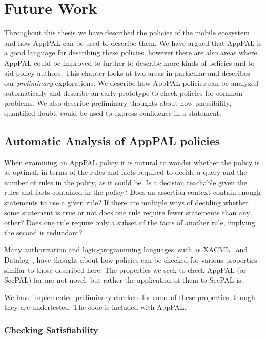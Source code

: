 \documentclass[thesis.tex]{subfiles}
\begin{document}
\chapter{Future Work}

Throughout this thesis we have described the policies of the mobile
ecosystem and how AppPAL can be used to describe them.  We have argued
that AppPAL is a good language for describing these policies, however
there are also areas where AppPAL could be improved to further to
describe more kinds of policies and to aid policy authors.  This
chapter looks at two areas in particular and describes our
\emph{preliminary} explorations.  We describe how AppPAL policies can
be analyzed automatically and describe an early prototype to check
policies for common problems.  We also describe preliminary thoughts
about how plausibility, quantified doubt, could be used to express
confidence in a statement.

\section{Automatic Analysis of AppPAL policies}
\label{sec:lint}

When examining an AppPAL policy it is natural to wonder whether the
policy is as optimal, in terms of the rules and facts required to
decide a query and the number of rules in the policy, as it could
be. Is a decision reachable given the rules and facts contained in the
policy?  Does an assertion context contain enough statements to use a
given rule? If there are multiple ways of deciding whether some
statement is true or not does one rule require fewer statements than
any other? Does one rule require only a subset of the facts of another
rule, implying the second is redundant?

Many authorization and logic-programming languages, such as
XACML~\cite{ramli_detecting_2015} and
Datalog~\cite{alon_levy_equivalence_1993,alon_levy_constraints_1992}, have
thought about how policies can be checked for various properties
similar to those described here.  The properties we seek to check
AppPAL (or SecPAL) for are not novel, but rather the application of
them to SecPAL is.

We have implemented preliminary checkers for some of these properties,
though they are undertested.  The code is included with AppPAL.

\subsection{Checking Satisfiability}
\end{document}
